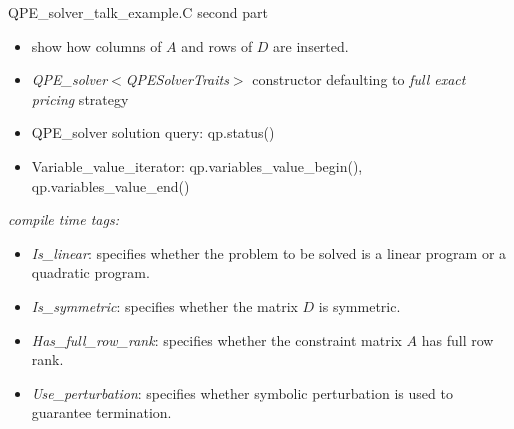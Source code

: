 \documentclass{slides}
\begin{document}
\begin{slide}
QPE\_solver\_talk\_example.C second part
\end{slide}

\begin{note}
\begin{itemize}
\item show how columns of $A$ and rows of $D$ are inserted.
\item \emph{QPE\_solver$<$QPESolverTraits$>$} constructor defaulting to
\emph{full exact pricing} strategy
\item QPE\_solver solution query: qp.status()
\item Variable\_value\_iterator: qp.variables\_value\_begin(),
qp.variables\_value\_end()
\end{itemize}
\end{note}

%



\begin{slide}
\emph{compile time tags:}
\begin{itemize}
\item \emph{Is\_linear}: specifies whether the problem to be solved is a linear
program or a quadratic program.
\item \emph{Is\_symmetric}: specifies whether the matrix $D$ is symmetric.  
\item \emph{Has\_full\_row\_rank}: specifies whether the constraint matrix $A$
has full row rank.
\item \emph{Use\_perturbation}: specifies whether symbolic perturbation is 
used to guarantee termination.
\end{itemize}
\end{slide}
\end{document}
